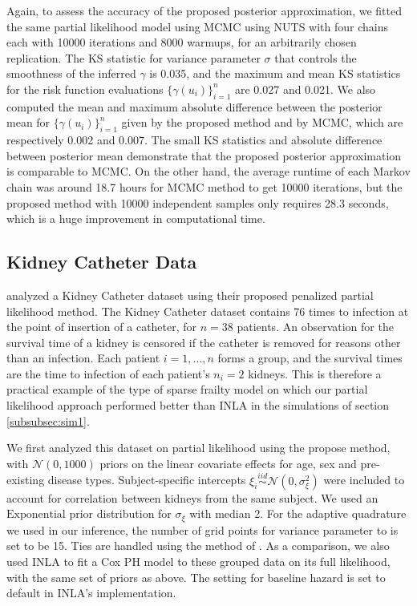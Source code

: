 \documentclass[ba]{imsart}
\begin{document}
Again, to assess the accuracy of the proposed posterior approximation, we fitted the same partial likelihood model using MCMC using NUTS with four chains each with 10000 iterations and 8000 warmups, for an arbitrarily chosen replication. The KS statistic for variance parameter $\sigma$ that controls the smoothness of the inferred $\gamma$ is 0.035, and the maximum and mean KS statistics for the risk function evaluations $\{\gamma(u_i)\}_{i=1}^n$ are 0.027 and 0.021. We also computed the mean and maximum absolute difference between the posterior mean for $\{\gamma(u_i)\}_{i=1}^n$ given by the proposed method and by MCMC, which are respectively 0.002 and 0.007. The small KS statistics and absolute difference between posterior mean demonstrate that the proposed posterior approximation is comparable to MCMC. On the other hand, the average runtime of each Markov chain was around 18.7 hours for MCMC method to get 10000 iterations, but the proposed method with 10000 independent samples only requires 28.3 seconds, which is a huge improvement in computational time.

\subsection{Kidney Catheter Data}\label{subsec:kidney}

\cite{freqPL} analyzed a Kidney Catheter dataset using their proposed penalized partial likelihood method. The Kidney Catheter dataset contains 76 times to infection at the point of insertion of a catheter, for $n = 38$ patients. An observation for the survival time of a kidney is censored if the catheter is removed for reasons other than an infection.  Each patient $i=1,\ldots,n$ forms a group, and the survival times are the time to infection of each patient's $n_{i} = 2$ kidneys. This is therefore a practical example of the type of sparse frailty model on which our partial likelihood approach performed better than INLA in the simulations of section \ref{subsubsec:sim1}.

We first analyzed this dataset on partial likelihood using the propose method, with $\mathcal{N}(0, 1000)$ priors on the linear covariate effects for age, sex and pre-existing disease types. Subject-specific intercepts $\xi_{i}\overset{iid}{\sim}\mathcal{N}(0,\sigma^{2}_{\xi})$ were included to account for correlation between kidneys from the same subject. We used an $\text{Exponential}$ prior distribution for $\sigma_{\xi}$ with median 2. For the adaptive quadrature we used in our inference, the number of grid points for variance parameter to is set to be 15. Ties are handled using the method of \cite{Breslow}.
As a comparison, we also used INLA to fit a Cox PH model to these grouped data on its full likelihood, with the same set of priors as above. The setting for baseline hazard is set to default in INLA's implementation.
\end{document}
